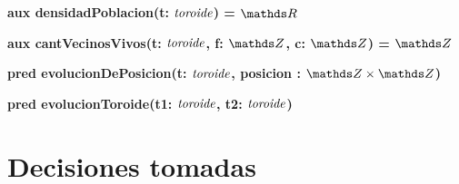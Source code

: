 \documentclass[a4paper]{article}
\newcommand{\tupla}[2]{#1 \times #2}
\begin{document}
\begin{ejercicio}[:]
\textbf{aux densidadPoblacion(t: $\textit{toroide}$) = $\float$}


\end{ejercicio}



\begin{ejercicio}[:]
\textbf{aux cantVecinosVivos(t: $\textit{toroide}$, f: $\ent$, c: $\ent$) = $\ent$}

\end{ejercicio}



\begin{ejercicio}[:]
\textbf{pred evolucionDePosicion(t: $\textit{toroide}$, posicion : $\tupla{\ent}{\ent}$)}

\end{ejercicio}



\begin{ejercicio}[:]
\textbf{pred evolucionToroide(t1: $\textit{toroide}$, t2: $\textit{toroide}$)}

\end{ejercicio}




\section{Decisiones tomadas}
\end{document}
